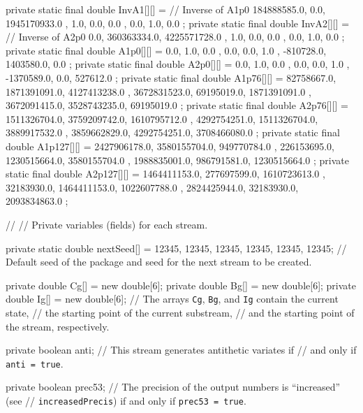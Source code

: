\begin{code}
\begin{hide}
{   private static final double InvA1[][] = {   // Inverse of A1p0
      { 184888585.0, 0.0, 1945170933.0 },
      {         1.0, 0.0,          0.0 },
      {         0.0, 1.0,          0.0 }
      };
   private static final double InvA2[][] = {   // Inverse of A2p0
      { 0.0, 360363334.0, 4225571728.0 },
      { 1.0,         0.0,          0.0 },
      { 0.0,         1.0,          0.0 }
      };
   private static final double A1p0[][]  =  {
      {       0.0,       1.0,      0.0 },
      {       0.0,       0.0,      1.0 },
      { -810728.0, 1403580.0,      0.0 }
      };
   private static final double A2p0[][]  =  {
      {        0.0,   1.0,         0.0 },
      {        0.0,   0.0,         1.0 },
      { -1370589.0,   0.0,    527612.0 }
      };
   private static final double A1p76[][] = {
      {      82758667.0, 1871391091.0, 4127413238.0 },
      {    3672831523.0,   69195019.0, 1871391091.0 },
      {    3672091415.0, 3528743235.0,   69195019.0 }
      };
   private static final double A2p76[][] = {
      {    1511326704.0, 3759209742.0, 1610795712.0 },
      {    4292754251.0, 1511326704.0, 3889917532.0 },
      {    3859662829.0, 4292754251.0, 3708466080.0 }
      };
   private static final double A1p127[][] = {
      {    2427906178.0, 3580155704.0,  949770784.0 },
      {     226153695.0, 1230515664.0, 3580155704.0 },
      {    1988835001.0,  986791581.0, 1230515664.0 }
      };
   private static final double A2p127[][] = {
      {    1464411153.0,  277697599.0, 1610723613.0 },
      {      32183930.0, 1464411153.0, 1022607788.0 },
      {    2824425944.0,   32183930.0, 2093834863.0 }
      };


// %
// Private variables (fields) for each stream.

   private static double nextSeed[] = {12345, 12345, 12345, 12345, 12345, 12345};
   // Default seed of the package and seed for the next stream to be created.

   private double Cg[] = new double[6];
   private double Bg[] = new double[6];
   private double Ig[] = new double[6];
   // The arrays \texttt{Cg}, \texttt{Bg}, and \texttt{Ig} contain the current state, 
   // the starting point of the current substream,
   // and the starting point of the stream, respectively.

   private boolean anti;
   // This stream generates antithetic variates if 
   // and only if \texttt{anti = true}.

   private boolean prec53;
   // The precision of the output numbers is ``increased'' (see
   // \texttt{increasedPrecis}) if and only if \texttt{prec53 = true}.

}
\end{hide}
\end{code}
